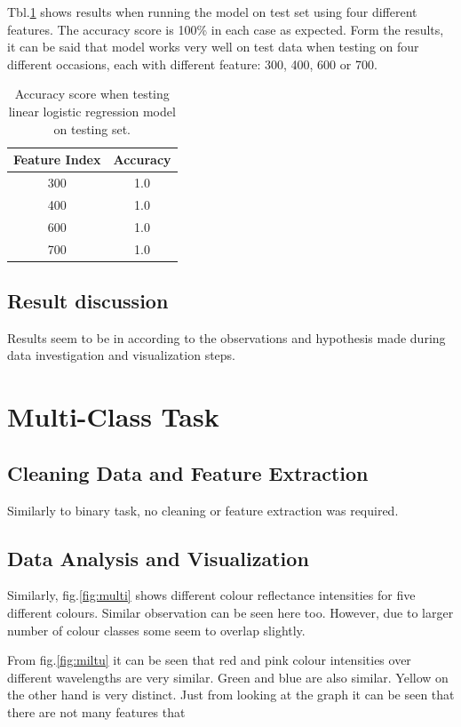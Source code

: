 \documentclass[11pt]{article}
\begin{document}
			Tbl.\ref{tbl:binary_test_table} shows results when running the model on test set using four different features. The accuracy score is 100\% in each case as expected. Form the results, it can be said that model works very well on test data when testing on four different occasions, each with different feature: 300, 400, 600 or 700.
			\begin{center}
		  	\begin{table}
		  	\centering
			\begin{tabular}[b]{|c | c|}
				 \hline
				 Feature Index 	 & Accuracy \\ 
 				 \hline
				 300 				& 1.0 	\\ 
				 400 				& 1.0 	\\ 
				 600		 		& 1.0 	\\ 
				 700				& 1.0 	\\ 
				 \hline
			\end{tabular}
			\caption{Accuracy score when testing linear logistic regression model on testing set.}
			\label{tbl:binary_test_table}
			\end{table}
		\end{center}
	\subsection{Result discussion}
		Results seem to be in according to the observations and hypothesis made during data investigation and visualization steps. 

	\section{Multi-Class Task}
		\subsection{Cleaning Data and Feature Extraction}
			Similarly to binary task, no cleaning or feature extraction was required.

		\subsection{Data Analysis and Visualization}

			Similarly, fig.\ref{fig:multi} shows different colour reflectance intensities for five different colours. Similar observation can be seen here too. However, due to larger number of colour classes some seem to overlap slightly. 

			From fig.\ref{fig:miltu} it can be seen that red and pink colour intensities over different wavelengths are very similar. Green and blue are also similar. Yellow on the other hand is very distinct. Just from looking at the graph it can be seen that there are not many features that 
\end{document}
